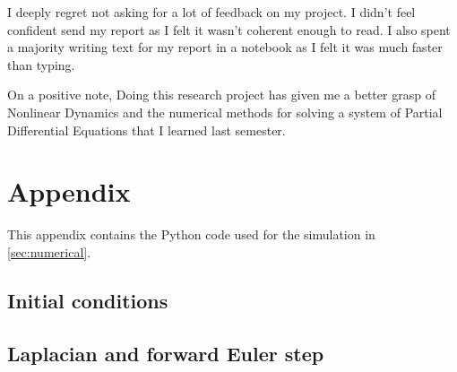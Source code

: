 \documentclass[a4paper, 11pt]{article}
\begin{document}
I deeply regret not asking for a lot of feedback on my project. I didn't feel confident send my report as I felt it wasn't coherent enough to read. I also spent a majority writing text for my report in a notebook as I felt it was much faster than typing. 


On a positive note, Doing this research project has given me a better grasp of Nonlinear Dynamics and the numerical methods for solving a system of Partial Differential Equations that I learned last semester. 


\section{Appendix}
\label{sec:appendix}
This appendix contains the Python code used for the simulation in \cref{sec:numerical}.

\subsection{Initial conditions}


\subsection{Laplacian and forward Euler step}

\end{document}

